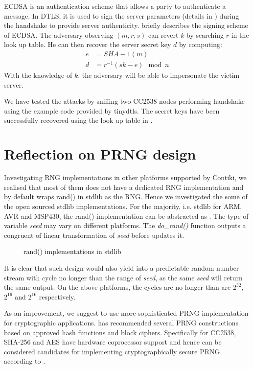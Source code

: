 \begin{itemize}
	ECDSA is an authentication scheme that allows a party to authenticate a message. In DTLS, it is used to sign the server parameters (details in \cite{rfc3279}) during the handshake to provide server authenticity.  briefly describes the signing scheme of ECDSA. The adversary observing $(m,r,s)$ can revert $k$ by searching $r$ in the look up table. He can then recover the server secret key $d$ by computing:
	\begin{equation}
		\begin{aligned}
		e &= SHA-1(m) \\
		d &= r^{-1}(sk - e) \mod n
		\end{aligned}
	\end{equation}
	With the knowledge of $k$, the adversary will be able to impersonate the victim server.
\end{itemize}

We have tested the attacks by sniffing two CC2538 nodes performing handshake using the example code provided by tinydtls. The secret keys have been successfully recovered using the look up table in \cite{prngtest}.

\section{Reflection on PRNG design}
Investigating RNG implementations in other platforms supported by Contiki, we realised that most of them does not have a dedicated RNG implementation and by default wraps rand() in stdlib as the RNG. Hence we investigated the some of the open sourced stdlib implementations. For the majority, i.e. stdlib for ARM\cite{ARMrand}, AVR\cite{AVRrand} and MSP430\cite{MSP430rand}, the rand() implementation can be abstracted as . The type of variable \textit{seed}  may vary on different platforms. The \textit{do\_rand()} function outputs a congruent of linear transformation of \textit{seed} before updates it.
 
\begin{figure}

\caption{rand() implementations in stdlib}
\label{rand}
\end{figure}

It is clear that such design would also yield into a predictable random number stream with cycle no longer than the range of \textit{seed}, as the same \textit{seed} will return the same output. On the above platforms, the cycles are no longer than are $2^{32}$, $2^{16}$ and $2^{16}$ respectively.

As an improvement, we suggest to use more sophisticated PRNG implementation for cryptographic applications. \cite{NISTPRNG} has recommended several PRNG constructions based on approved hash functions and block ciphers. Specifically for CC2538, SHA-256 and AES have hardware coprocessor support and hence can be considered candidates for implementing cryptographically secure PRNG according to \cite{NISTPRNG}.



